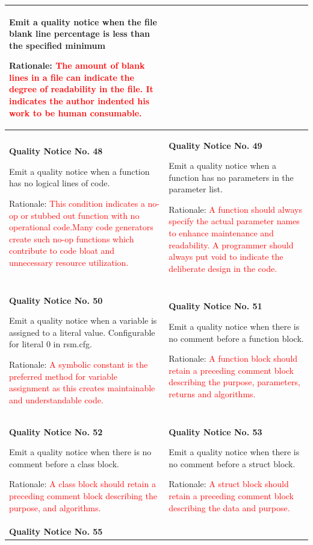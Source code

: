 {\begin{longtable}{||p{}|p{}||}
Emit a quality notice when the file blank line percentage is less than the specified minimum

Rationale: \textcolor{red}{The amount of blank lines in a file can indicate the degree of readability in the file. It indicates the author indented his work to be human consumable.}
    \\
    \hline
        \textbf{Quality Notice No. 48}
        
Emit a quality notice when a function has no logical lines of code. 
 
Rationale: \textcolor{red}{This condition indicates a no-op or stubbed out function with no operational code.Many code generators create such no-op functions which contribute to code bloat and unnecessary resource utilization.}
 & \textbf{Quality Notice No. 49}
 
Emit a quality notice when a function has no parameters in the parameter list.

Rationale:  \textcolor{red}{A function should always specify the actual parameter names to enhance maintenance and readability. A programmer should always put void to indicate the deliberate design in the code.}
    \\
    \hline
        \textbf{Quality Notice No. 50}
         
Emit a quality notice when a variable is assigned to a literal value. Configurable for literal 0 in rsm.cfg. 

Rationale: \textcolor{red}{A symbolic constant is the preferred method for variable assignment as this creates maintainable and understandable code.}
 & \textbf{Quality Notice No. 51}
 
Emit a quality notice when there is no comment before a function block. 
 
Rationale: \textcolor{red}{A function block should retain a preceding comment block describing the purpose, parameters, returns and algorithms.}
    \\
    \hline
     \textbf{Quality Notice No. 52}
     
Emit a quality notice when there is no comment before a class block. 
 
Rationale: \textcolor{red}{A class block should retain a preceding comment block describing the purpose, and algorithms.}
 & \textbf{Quality Notice No. 53}
 
Emit a quality notice when there is no comment before a struct block. 

Rationale: \textcolor{red}{A struct block should retain a preceding comment block describing the data and purpose.}
    \\
    \hline
     \textbf{Quality Notice No. 55}
     

\end{longtable}}

